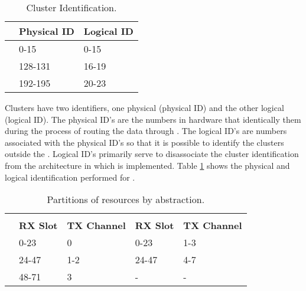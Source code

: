 	\begin{table}[t]
		\centering%
		\caption{Cluster Identification.}%
		\label{tab.cluster-id}%

		\begin{tabular}{|l|l|l|}
			\hline
						         & \textbf{Physical ID} & \textbf{Logical ID} \\ \hline
			\textbf{\ccluster}   & 0-15                 & 0-15                \\ \hline
			\textbf{\iocluster0} & 128-131              & 16-19               \\ \hline
			\textbf{\iocluster1} & 192-195              & 20-23               \\ \hline
		\end{tabular}

	\end{table}

	Clusters have two identifiers, one physical (physical ID) and the
	other logical (logical ID).
	The physical ID's are the numbers in hardware that identically them
	during the process of routing the data through \noc.
	The logical ID's are numbers associated with the physical ID's so
	that it is possible to identify the clusters outside the \hal.
	Logical ID's primarily serve to disassociate the cluster
	identification from the architecture in which \hal is implemented.
	Table \ref{tab.cluster-id} shows the physical and logical
	identification performed for \mppa.

	\begin{table}[t]
		\centering%
		\caption{Partitions of \noc resources by abstraction.}%
		\label{tab.noc-resources}%

		\begin{tabular}{l|l|l|l|l|}
			\cline{2-5}
										            & \multicolumn{2}{c|}{\textbf{\cnoc}}    & \multicolumn{2}{c|}{\textbf{\dnoc}}    \\ \cline{2-5}
										            & \textbf{RX Slot} & \textbf{TX Channel} & \textbf{RX Slot} & \textbf{TX Channel} \\ \hline
			\multicolumn{1}{|l|}{\textbf{\mailbox}} & 0-23             & 0                   & 0-23             & 1-3                 \\ \hline
			\multicolumn{1}{|l|}{\textbf{\portal}}  & 24-47            & 1-2                 & 24-47            & 4-7                 \\ \hline
			\multicolumn{1}{|l|}{\textbf{\sync}}    & 48-71            & 3                   & -                & -                   \\ \hline
		\end{tabular}

	\end{table}

